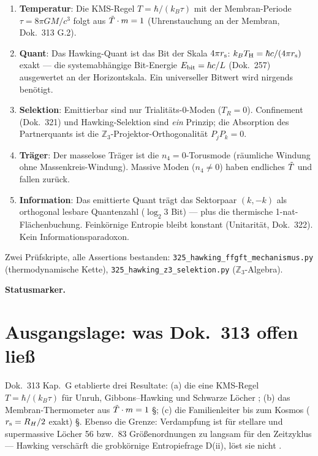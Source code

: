\begin{enumerate}
  \item \textbf{Temperatur}: Die KMS-Regel $T = \hbar/(k_B\tau)$ mit der
    Membran-Periode $\tau = 8\pi GM/c^3$ folgt aus $\tilde{T}\cdot m = 1$
    (Uhrenstauchung an der Membran, Dok.\ 313 G.2). \K
  \item \textbf{Quant}: Das Hawking-Quant ist das Bit der Skala $4\pi r_{\mathrm{s}}$:
    $k_BT_{\mathrm{H}} = \hbar c/(4\pi r_{\mathrm{s}})$ exakt — die systemabhängige Bit-Energie
    $E_{\mathrm{bit}} = \hbar c/L$ (Dok.\ 257) ausgewertet an der Horizontskala.
    Ein universeller Bitwert wird nirgends benötigt. \K
  \item \textbf{Selektion}: Emittierbar sind nur Trialitäts-0-Moden
    ($T_R = 0$). Confinement (Dok.\ 321) und Hawking-Selektion sind
    \emph{ein} Prinzip; die Absorption des Partnerquants ist die
    $\mathbb{Z}_3$-Projektor-Orthogonalität $P_jP_k = 0$. \B
  \item \textbf{Träger}: Der masselose Träger ist die $n_4 = 0$-Torusmode
    (räumliche Windung ohne Massenkreis-Windung). Massive Moden
    ($n_4 \neq 0$) haben endliches $\tilde{T}$ und fallen zurück. \K
  \item \textbf{Information}: Das emittierte Quant trägt das Sektorpaar
    $(k, -k)$ als orthogonal lesbare Quantenzahl ($\log_2 3$ Bit) —
    plus die thermische 1-nat-Flächenbuchung. Feinkörnige Entropie bleibt
    konstant (Unitarität, Dok.\ 322). Kein Informationsparadoxon. \K
\end{enumerate}

Zwei Prüfskripte, alle Assertions bestanden:
\texttt{325\_hawking\_ffgft\_mechanismus.py} (thermodynamische Kette),
\texttt{325\_hawking\_z3\_selektion.py} ($\mathbb{Z}_3$-Algebra).



\medskip\noindent\textbf{Statusmarker.}


\section{Ausgangslage: was Dok.\ 313 offen ließ}

Dok.\ 313 Kap.\ G etablierte drei Resultate: (a) die eine KMS-Regel
$T = \hbar/(k_B\tau)$ für Unruh, Gibbons–Hawking und Schwarze Löcher \K;
(b) das Membran-Thermometer aus $\tilde{T}\cdot m = 1$ \S; (c) die
Familienleiter bis zum Kosmos ($r_{\mathrm{s}} = R_H/2$ exakt) \S. Ebenso die
Grenze: Verdampfung ist für stellare und supermassive Löcher 56 bzw.\ 83
Größenordnungen zu langsam für den Zeitzyklus — Hawking verschärft die
grobkörnige Entropiefrage D(ii), löst sie nicht \K.

